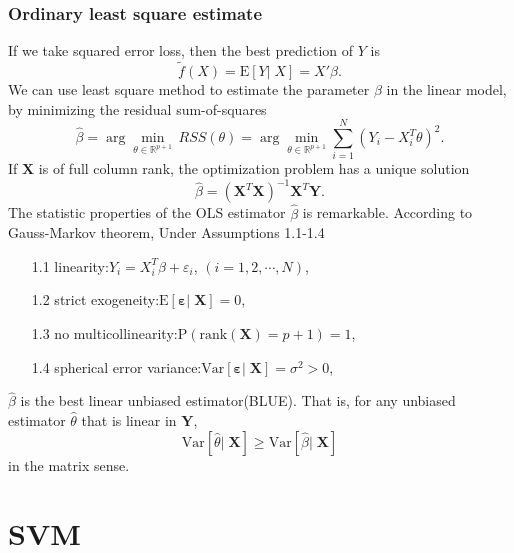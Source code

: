 \documentclass{report}
\theoremstyle{nonumberplain}
\newcommand{\E}{\mathrm{E}}
\newcommand{\Var}{\mathrm{Var}}
\newcommand{\Y}{\mathbf{Y}}
\newcommand{\X}{\mathbf{X}}
\newcommand{\0}{\mathbf{0}}
\newcommand{\vep}{\bm{\varepsilon}}
\begin{document}
\subsection{Ordinary least square estimate}
If we take squared error loss, then the best prediction of $Y$ is
\[
\tilde{f}(X) = \mathrm{E}[Y|\; X]=X'\beta.
\]
We can use least square method to estimate the parameter $\beta$ in the linear model, by minimizing the residual sum-of-squares
\[
\hat{\beta}=\arg\min_{\theta\in\mathbb{R}^{p+1}}\, RSS(\theta)=\arg\min_{\theta\in\mathbb{R}^{p+1}}\sum_{i=1}^N(Y_i-X_i^T\theta)^2.
\]
If $\X$ is of full column rank, the optimization problem has a unique solution
\[
\hat{\beta}=(\X^T\X)^{-1}\X^T\Y.
\]
The statistic properties of the OLS estimator $\hat{\beta}$ is remarkable. According to Gauss-Markov theorem, Under Assumptions 1.1-1.4
\begin{enumerate}
	\item[1.1]linearity:\quad $Y_i= X_i^T\beta+\varepsilon_i$, $(i=1,2,\cdots,N)$,
	\item[1.2] strict exogeneity:\quad $\E[\vep|\;\X]=0$,
	\item[1.3] no multicollinearity:\quad  $\mathrm{P}(\mathrm{rank}(\X)=p+1)=1$,
	\item[1.4] spherical error variance:\quad $\Var[\vep|\;\X]=\sigma^2>0$,
\end{enumerate}
$\hat{\beta}$ is the best linear unbiased estimator(BLUE). That is, for any unbiased estimator $\hat{\theta}$ that is linear in $\Y$, 
\[
\Var[\hat{\theta}|\;\X]\ge\Var[\hat{\beta}|\;\X]
\]
in the matrix sense. 

\chapter{SVM}
\end{document}
